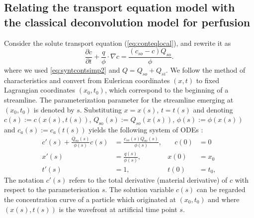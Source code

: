 \documentclass[paper=a4, fontsize=11pt,parskip=half,headings=small]{scrartcl}
\newcommand{\Qso}{Q_{\mathrm{so}}}
\begin{document}
\subsection{Relating the transport equation model with the classical deconvolution model for perfusion}
\label{sec:relating}
Consider the solute transport equation (\ref{eq:conteqlocal}), and rewrite it as
\begin{equation}
	\frac{\partial c}{\partial t} + \frac{q}{\phi} \cdot \nabla c = \frac{(c_{so}-c)Q_{so}}{\phi }.
	\label{eq:conteqlocal3}
\end{equation}
where we used \eqref{eq:syntcontsimp2} and $Q = Q_{so} + Q_{si}$.
We follow the method of characteristics and convert from Eulerican coordinates $(x,t)$ to fixed Lagrangian coordinates $(x_0,t_0)$, which correspond to the beginning of a streamline. The parameterization parameter for the streamline emerging at $(x_0,t_0)$ is denoted by $s$. 
Substituting $x = x(s)$, $t=t(s)$ and denoting $c(s):=c(x(s),t(s))$, $\Qso(s):=Q_{so}(x(s))$, $\phi(s):=\phi(x(s))$ and $c_a(s):=c_a(t(s))$  yields the following system of ODEs \cite{evans98}:
\begin{subequations}
	\label{eq:ODEs}
	\begin{alignat}{2}
		c'(s) + \frac{\Qso(s)}{\phi(s)}c(s) &= \frac{c_{so}(s)\Qso(s)}{\phi(s)}, & \quad c(0) &= 0 \label{eq:ODEC} \\
		x'(s) &= \frac{q(s)}{\phi(s)}, &x(0) &= x_0 \label{eq:ODEx}\\
		t'(s) &= 1,     &t(0) &= t_0, \label{eq:ODEt}
	\end{alignat}
\end{subequations}
The notation $c'(s)$ refers to the total derivative (material derivative) of $c$ with respect to the parameterisation $s$.
The solution variable $c(s)$ can be regarded the concentration curve of a particle which originated at $(x_0,t_0)$ and where $(x(s),t(s))$ is the wavefront at artificial time point $s$. 
\end{document}
